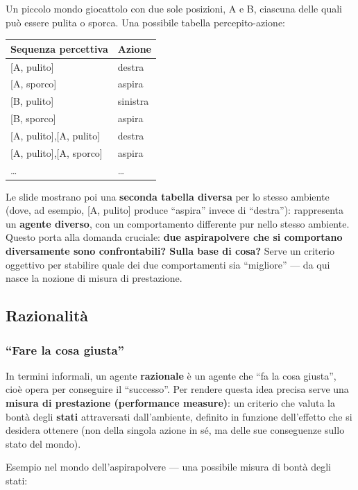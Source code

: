 \documentclass[11pt,a4paper]{report}
\begin{document}
Un piccolo mondo giocattolo con due sole posizioni, A e B, ciascuna delle quali può essere pulita o sporca. Una possibile tabella percepito-azione:

\begin{center}
\begin{tabular}{@{}ll@{}}
\toprule
\textbf{Sequenza percettiva} & \textbf{Azione} \\
\midrule
{}[A, pulito] & destra \\
{}[A, sporco] & aspira \\
{}[B, pulito] & sinistra \\
{}[B, sporco] & aspira \\
{}[A, pulito],[A, pulito] & destra \\
{}[A, pulito],[A, sporco] & aspira \\
\dots & \dots \\
\bottomrule
\end{tabular}
\end{center}

Le slide mostrano poi una \textbf{seconda tabella diversa} per lo stesso ambiente (dove, ad esempio, [A, pulito] produce ``aspira'' invece di ``destra''): rappresenta un \textbf{agente diverso}, con un comportamento differente pur nello stesso ambiente. Questo porta alla domanda cruciale: \textbf{due aspirapolvere che si comportano diversamente sono confrontabili? Sulla base di cosa?} Serve un criterio oggettivo per stabilire quale dei due comportamenti sia ``migliore'' --- da qui nasce la nozione di misura di prestazione.

\subsection{Razionalità}

\subsubsection*{``Fare la cosa giusta''}

In termini informali, un agente \textbf{razionale} è un agente che ``fa la cosa giusta'', cioè opera per conseguire il ``successo''. Per rendere questa idea precisa serve una \textbf{misura di prestazione (performance measure)}: un criterio che valuta la bontà degli \textbf{stati} attraversati dall'ambiente, definito in funzione dell'effetto che si desidera ottenere (non della singola azione in sé, ma delle sue conseguenze sullo stato del mondo).

Esempio nel mondo dell'aspirapolvere --- una possibile misura di bontà degli stati:
\end{document}
